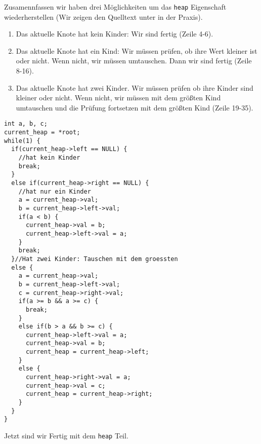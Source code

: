 Zusamennfassen wir haben drei Möglichkeiten um das \texttt{heap} Eigenschaft wiederherstellen
(Wir zeigen den Quelltext unter in der Praxis).
\begin{enumerate}
\item Das aktuelle Knote hat kein Kinder: Wir sind fertig (Zeile 4-6).
\item Das aktuelle Knote hat ein Kind: Wir müssen prüfen, ob ihre Wert kleiner ist oder nicht.
Wenn nicht, wir müssen umtauschen. Dann wir sind fertig (Zeile 8-16).
\item Das aktuelle Knote hat zwei Kinder. Wir müssen prüfen ob ihre Kinder sind kleiner oder nicht.
Wenn nicht, wir müssen mit dem größten Kind umtauschen und die Prüfung fortsetzen mit dem größten Kind (Zeile 19-35).
\end{enumerate}
\begin{lstlisting}
int a, b, c;
current_heap = *root;
while(1) {
  if(current_heap->left == NULL) {
    //hat kein Kinder
    break;
  }
  else if(current_heap->right == NULL) {
    //hat nur ein Kinder
    a = current_heap->val;
    b = current_heap->left->val;
    if(a < b) {
      current_heap->val = b;
      current_heap->left->val = a;
    }
    break;
  }//Hat zwei Kinder: Tauschen mit dem groessten
  else {
    a = current_heap->val;
    b = current_heap->left->val;
    c = current_heap->right->val;
    if(a >= b && a >= c) {
      break;
    }
    else if(b > a && b >= c) {
      current_heap->left->val = a;
      current_heap->val = b;
      current_heap = current_heap->left;
    }
    else {
      current_heap->right->val = a;
      current_heap->val = c;
      current_heap = current_heap->right;
    }
  }
}
\end{lstlisting}
Jetzt sind wir Fertig mit dem \texttt{heap} Teil.

